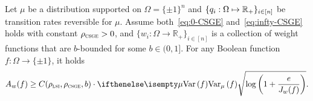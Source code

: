 \begin{theorem}\label{thm:eldan_gross}
     Let $\mu$ be a distribution supported on $\Omega = \{\pm 1\}^n$ and $\{q_i: \Omega \mapsto \mathbb{R}_+\}_{i\in[n]}$ be transition rates reversible for $\mu$.
    Assume both~\eqref{eq:0-CSGE} and~\eqref{eq:infty-CSGE} holds with constant $\rho_{{\normalfont\textsc{csge}}} > 0$, and $\{w_i:\Omega \to \mathbb{R}_+\}_{i \in [n]}$ is a collection of weight functions that are $b$-bounded for some $b \in (0,1]$.
    For any Boolean function $f:\Omega \to \{\pm 1\}$, it holds
   \begin{align}\label{eq:eldan_gross}
        A_w(f) %
        \geq C(\rho_{\LSI},\rho_{\CSGE},b) \cdot \Var[\mu]{f}\sqrt{\log\tp{1 + \frac e{J_w(f)}}}.
   \end{align}

\end{theorem}
